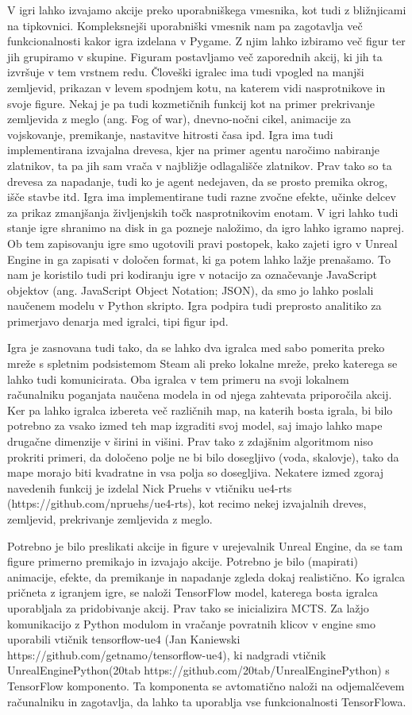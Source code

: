 \documentclass[a4paper, 12pt]{book}
\begin{document}
V igri lahko izvajamo akcije preko uporabniškega vmesnika, kot tudi z bližnjicami na tipkovnici.
Kompleksnejši uporabniški vmesnik nam pa zagotavlja več funkcionalnosti kakor igra izdelana v Pygame.
Z njim lahko izbiramo več figur ter jih grupiramo v skupine.
Figuram postavljamo več zaporednih akcij, ki jih ta izvršuje v tem vrstnem redu.
Človeški igralec ima tudi vpogled na manjši zemljevid, prikazan v levem spodnjem kotu, na katerem vidi nasprotnikove in svoje figure.
Nekaj je pa tudi kozmetičnih funkcij kot na primer prekrivanje zemljevida z meglo (ang. Fog of war), dnevno-nočni cikel, animacije za vojskovanje, premikanje, nastavitve hitrosti časa ipd.
Igra ima tudi implementirana izvajalna drevesa, kjer na primer agentu naročimo nabiranje zlatnikov, ta pa jih sam vrača v najbližje odlagališče zlatnikov.
Prav tako so ta drevesa za napadanje, tudi ko je agent nedejaven, da se prosto premika okrog, išče stavbe itd.
Igra ima implementirane tudi razne zvočne efekte, učinke delcev za prikaz zmanjšanja življenjskih točk nasprotnikovim enotam.
V igri lahko tudi stanje igre shranimo na disk in ga pozneje naložimo, da igro lahko igramo naprej.
Ob tem zapisovanju igre smo ugotovili pravi postopek, kako zajeti igro v Unreal Engine in ga zapisati v določen format, ki ga potem lahko lažje prenašamo.
To nam je koristilo tudi pri kodiranju igre v notacijo za označevanje JavaScript objektov (ang. JavaScript Object Notation; JSON), da smo jo lahko poslali naučenem modelu v Python skripto.
Igra podpira tudi preprosto analitiko za primerjavo denarja med igralci, tipi figur ipd.

Igra je zasnovana tudi tako, da se lahko dva igralca med sabo pomerita preko mreže s spletnim podsistemom Steam ali preko lokalne mreže, preko katerega se lahko tudi komunicirata.
Oba igralca v tem primeru na svoji lokalnem računalniku poganjata naučena modela in od njega zahtevata priporočila akcij.
Ker pa lahko igralca izbereta več različnih map, na katerih bosta igrala, bi bilo potrebno za vsako izmed teh map izgraditi svoj model, saj imajo lahko mape drugačne dimenzije v širini in višini.
Prav tako z zdajšnim algoritmom niso prokriti primeri, da določeno polje ne bi bilo dosegljivo (voda, skalovje), tako da mape morajo biti kvadratne in vsa polja so dosegljiva.
Nekatere izmed zgoraj navedenih funkcij je izdelal Nick Pruehs v vtičniku ue4-rts (https://github.com/npruehs/ue4-rts), kot recimo nekej izvajalnih dreves, zemljevid, prekrivanje zemljevida z meglo.

Potrebno je bilo preslikati akcije in figure v urejevalnik Unreal Engine, da se tam figure primerno premikajo in izvajajo akcije.
Potrebno je bilo (mapirati) animacije, efekte, da premikanje in napadanje zgleda dokaj realistično.
Ko igralca pričneta z igranjem igre, se naloži TensorFlow model, katerega bosta igralca uporabljala za pridobivanje akcij. Prav tako se inicializira MCTS.
Za lažjo komunikacijo z Python modulom in vračanje povratnih klicov v engine smo uporabili vtičnik tensorflow-ue4 (Jan Kaniewski https://github.com/getnamo/tensorflow-ue4), ki nadgradi vtičnik UnrealEnginePython(20tab https://github.com/20tab/UnrealEnginePython) s TensorFlow komponento. 
Ta komponenta se avtomatično naloži na odjemalčevem računalniku in zagotavlja, da lahko ta uporablja vse funkcionalnosti TensorFlowa.
 
\end{document}
